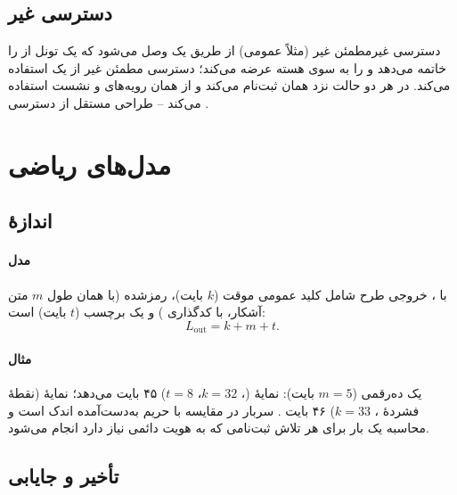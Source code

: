 \documentclass[11pt,a4paper]{article}
\begin{document}
\begin{acnfigure}
  \caption{همکاری  و  با  و گره‌های ترکیبی.}
  \label{fig:iw}
\end{acnfigure}

\subsection{دسترسی غیر }
دسترسی غیرمطمئن غیر (مثلاً  عمومی) از طریق یک  وصل می‌شود که یک تونل  از  را
خاتمه می‌دهد و  را به سوی هسته عرضه می‌کند؛ دسترسی مطمئن غیر از یک  استفاده می‌کند. در هر دو
حالت  نزد همان  ثبت‌نام می‌کند و از همان رویه‌های  و نشست  استفاده می‌کند -- طراحی مستقل از
دسترسی .

\section{مدل‌های ریاضی}

\subsection{اندازهٔ }\label{sec:suci}
\paragraph{مدل} با ، خروجی طرح شامل کلید عمومی موقت ($k$ بایت)،  رمزشده (با همان طول $m$ متن آشکار، با
کدگذاری ) و یک برچسب  ($t$ بایت) است:
\begin{equation}\label{eq:suci}
  L_{\mathrm{out}} = k + m + t .
\end{equation}
\paragraph{مثال} یک  ده‌رقمی ($m = 5$ بایت): نمایهٔ  (، $k = 32$، $t = 8$) ۴۵ بایت می‌دهد؛ نمایهٔ
 (نقطهٔ فشردهٔ ، $k = 33$) ۴۶ بایت \cite{ts33501}. سربار در مقایسه با حریم به‌دست‌آمده اندک است و محاسبه یک بار
برای هر تلاش ثبت‌نامی که به هویت دائمی نیاز دارد انجام می‌شود.

\subsection{تأخیر و جایابی }\label{sec:rtt}
\end{document}
